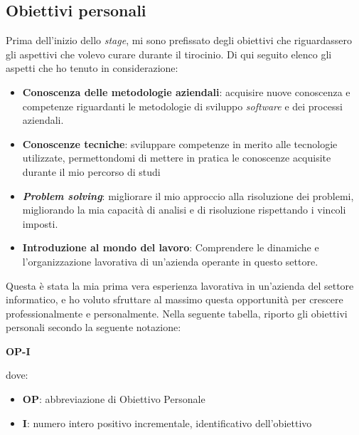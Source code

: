 \subsection{Obiettivi personali} \label{sec:obiettiviPersonali}
Prima dell'inizio dello \textit{stage}, mi sono prefissato degli obiettivi che riguardassero gli aspettivi che volevo curare durante il tirocinio. Di qui seguito elenco gli aspetti che ho tenuto in considerazione:
\begin{itemize}
    \item \textbf{Conoscenza delle metodologie aziendali}: acquisire nuove conoscenza e competenze riguardanti le metodologie di sviluppo \textit{software} e dei processi aziendali. 
    \item \textbf{Conoscenze tecniche}: sviluppare competenze in merito alle tecnologie utilizzate, permettondomi di mettere in pratica le conoscenze acquisite durante il mio percorso di studi
    \item \textbf{\textit{Problem solving}}: migliorare il mio approccio alla risoluzione dei problemi, migliorando la mia capacità di analisi e di risoluzione rispettando i vincoli imposti.
    \item \textbf{Introduzione al mondo del lavoro}: Comprendere le dinamiche e l'organizzazione lavorativa di un'azienda operante in questo settore.
\end{itemize}
Questa è stata la mia prima vera esperienza lavorativa in un'azienda del settore informatico, e ho voluto sfruttare al massimo questa opportunità per crescere professionalmente e personalmente.
Nella seguente tabella, riporto gli obiettivi personali secondo la seguente notazione:
\begin{center}
    \textbf{OP-I}
\end{center}
dove:
\begin{itemize}
    \item \textbf{OP}: abbreviazione di Obiettivo Personale
    \item \textbf{I}: numero intero positivo incrementale, identificativo dell'obiettivo
\end{itemize}

